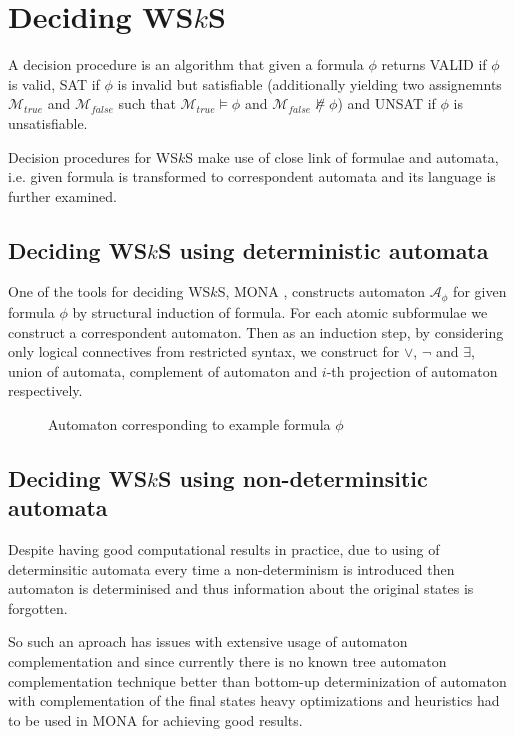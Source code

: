 \documentclass{eeict}
\begin{document}
\section{Deciding WS$k$S}

A decision procedure is an algorithm that given a formula $\phi$ returns VALID
if $\phi$ is valid, SAT if $\phi$ is invalid but satisfiable (additionally
yielding two assignemnts $\mathcal{M}_{true}$ and $\mathcal{M}_{false}$ such
that $\mathcal{M}_{true} \vDash \phi$ and $\mathcal{M}_{false}\not\nvDash \phi$)
and UNSAT if $\phi$ is unsatisfiable.

Decision procedures for WS$k$S make use of close link of formulae and automata,
i.e. given formula is transformed to correspondent automata and its language is
further examined.

\subsection{Deciding WS$k$S using deterministic automata}

One of the tools for deciding WS$k$S, MONA \cite{mona}, constructs automaton
$\mathcal{A}_\phi$ for given formula $\phi$	by structural induction of formula.
For each atomic subformulae we construct a correspondent automaton. Then as an
induction step, by considering only logical connectives from restricted syntax,
we construct for $\vee$, $\neg$ and $\exists$, union of automata, complement of
automaton and $i$-th projection of automaton respectively.

\begin{figure}
 \begin{center}
  
 \end{center}
 \caption{Automaton corresponding to example formula $\phi$}
\end{figure}

\subsection{Deciding WS$k$S using non-determinsitic automata}

Despite having good computational results in practice, due to using of
determinsitic automata every time a non-determinism is introduced then automaton
is determinised and thus information about the original states is forgotten.

So such an aproach has issues with extensive usage of automaton complementation
and since currently there is no known tree automaton complementation technique
better than bottom-up determinization of automaton with complementation of the
final states heavy optimizations and heuristics had to be used in MONA for
achieving good results.
\end{document}
